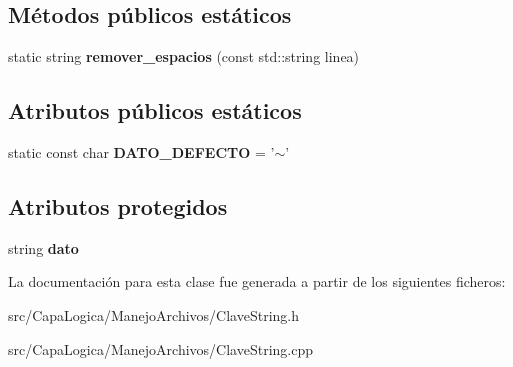 \subsection*{\-Métodos públicos estáticos}
\begin{DoxyCompactItemize}
\item 
\hypertarget{class_clave_string_a54ddd1c46b7bc586b6b079de4387329d}{static string {\bfseries remover\-\_\-espacios} (const std\-::string linea)}\label{class_clave_string_a54ddd1c46b7bc586b6b079de4387329d}

\end{DoxyCompactItemize}
\subsection*{\-Atributos públicos estáticos}
\begin{DoxyCompactItemize}
\item 
\hypertarget{class_clave_string_af2ebe08bd7b3ebda5f5be67364dfdc47}{static const char {\bfseries \-D\-A\-T\-O\-\_\-\-D\-E\-F\-E\-C\-T\-O} = '$\sim$'}\label{class_clave_string_af2ebe08bd7b3ebda5f5be67364dfdc47}

\end{DoxyCompactItemize}
\subsection*{\-Atributos protegidos}
\begin{DoxyCompactItemize}
\item 
\hypertarget{class_clave_string_a77879b46e190bad97d88a5eef08b95c8}{string {\bfseries dato}}\label{class_clave_string_a77879b46e190bad97d88a5eef08b95c8}

\end{DoxyCompactItemize}


\-La documentación para esta clase fue generada a partir de los siguientes ficheros\-:\begin{DoxyCompactItemize}
\item 
src/\-Capa\-Logica/\-Manejo\-Archivos/\-Clave\-String.\-h\item 
src/\-Capa\-Logica/\-Manejo\-Archivos/\-Clave\-String.\-cpp\end{DoxyCompactItemize}
